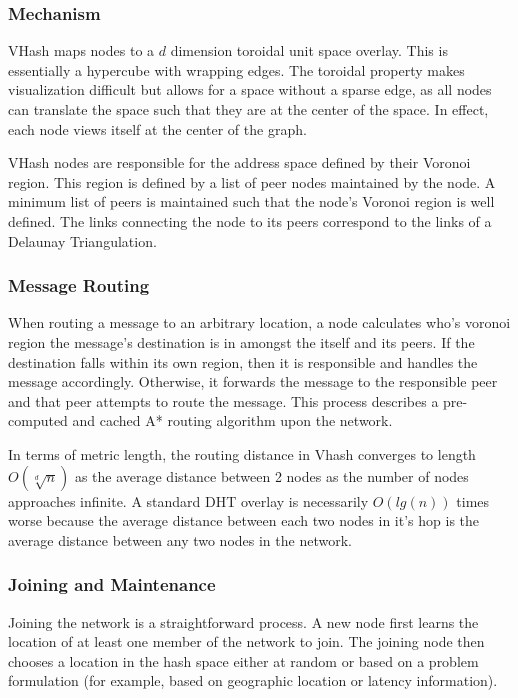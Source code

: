 \documentclass{article}
\begin{document}
\subsubsection*{Mechanism}
VHash maps nodes to a $d$ dimension toroidal unit space overlay. This is essentially a hypercube with wrapping edges. The toroidal property makes visualization difficult but allows for a space without a sparse edge, as all nodes can translate the space such that they are at the center of the space.  In effect, each node views itself at the center of the graph.

VHash nodes are responsible for the address space defined by their Voronoi region. This region is defined by a list of peer nodes maintained by the node. A minimum list of peers is maintained such that the node's Voronoi region is well defined. The links connecting the node to its peers correspond to the links of a Delaunay Triangulation.

\subsubsection*{Message Routing}
When routing a message to an arbitrary location, a node calculates who's voronoi region the message's destination is in amongst the itself and its peers. If the destination falls within its own region, then it is responsible and handles the message accordingly. Otherwise, it forwards the message to the responsible peer and that peer attempts to route the message. This process describes a pre-computed and cached A*\citep{astar} routing algorithm upon the network. 

In terms of metric length, the routing distance in Vhash converges to length $O(\sqrt[d]{n})$ as the average distance between 2 nodes as the number of nodes approaches infinite. A standard DHT overlay is necessarily $O(lg(n))$ times worse because the average distance between each two nodes in it's hop is the average distance between any two nodes in the network. 

\subsubsection*{Joining and Maintenance}
Joining the network is a straightforward process. A new node first learns the location of at least one member of the network to join. The joining node then chooses a location in the hash space either at random or based on a problem formulation (for example, based on geographic location or latency information).
\end{document}
